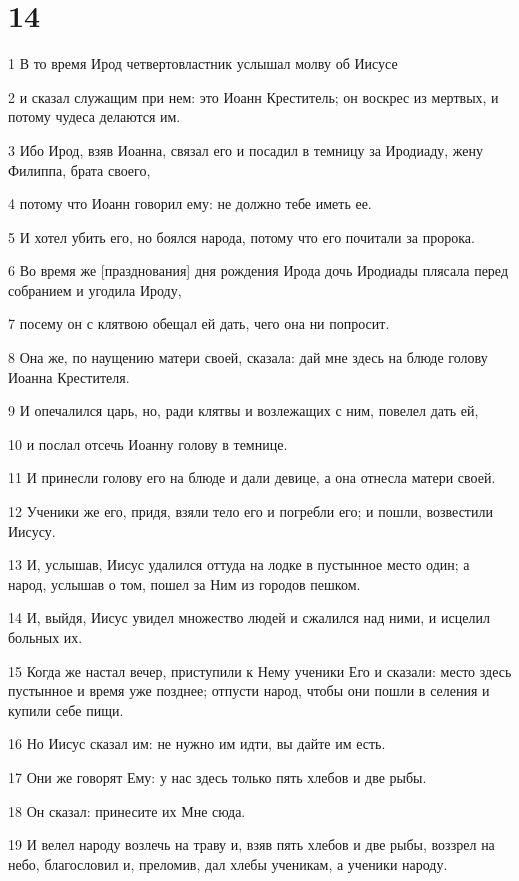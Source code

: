 \chapter{14}

\par 1 В то время Ирод четвертовластник услышал молву об Иисусе
\par 2 и сказал служащим при нем: это Иоанн Креститель; он воскрес из мертвых, и потому чудеса делаются им.
\par 3 Ибо Ирод, взяв Иоанна, связал его и посадил в темницу за Иродиаду, жену Филиппа, брата своего,
\par 4 потому что Иоанн говорил ему: не должно тебе иметь ее.
\par 5 И хотел убить его, но боялся народа, потому что его почитали за пророка.
\par 6 Во время же [празднования] дня рождения Ирода дочь Иродиады плясала перед собранием и угодила Ироду,
\par 7 посему он с клятвою обещал ей дать, чего она ни попросит.
\par 8 Она же, по наущению матери своей, сказала: дай мне здесь на блюде голову Иоанна Крестителя.
\par 9 И опечалился царь, но, ради клятвы и возлежащих с ним, повелел дать ей,
\par 10 и послал отсечь Иоанну голову в темнице.
\par 11 И принесли голову его на блюде и дали девице, а она отнесла матери своей.
\par 12 Ученики же его, придя, взяли тело его и погребли его; и пошли, возвестили Иисусу.
\par 13 И, услышав, Иисус удалился оттуда на лодке в пустынное место один; а народ, услышав о том, пошел за Ним из городов пешком.
\par 14 И, выйдя, Иисус увидел множество людей и сжалился над ними, и исцелил больных их.
\par 15 Когда же настал вечер, приступили к Нему ученики Его и сказали: место здесь пустынное и время уже позднее; отпусти народ, чтобы они пошли в селения и купили себе пищи.
\par 16 Но Иисус сказал им: не нужно им идти, вы дайте им есть.
\par 17 Они же говорят Ему: у нас здесь только пять хлебов и две рыбы.
\par 18 Он сказал: принесите их Мне сюда.
\par 19 И велел народу возлечь на траву и, взяв пять хлебов и две рыбы, воззрел на небо, благословил и, преломив, дал хлебы ученикам, а ученики народу.

